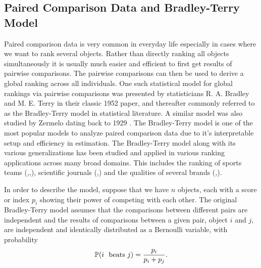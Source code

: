 \documentclass{article}
\begin{document}
\subsection{Paired Comparison Data and Bradley-Terry Model}
Paired comparison data is very common in everyday life especially in cases where we want to rank several objects. Rather than directly ranking all objects simultaneously it is usually much easier and efficient to first get results of pairwise comparisons. The pairwise comparisons can then be used to derive a global ranking across all individuals. 
One such statistical model for global rankings via pairwise comparisons was presented by statisticians R. A. Bradley and M. E. Terry in their classic 1952 \cite{bradley1952rank} paper, and thereafter commonly referred to as the Bradley-Terry model in statistical literature. A similar model was also studied by Zermelo dating back to 1929 \cite{Zermelo1929}. The Bradley-Terry model is one of the most popular models to analyze paired comparison data due to it's interpretable setup and efficiency in estimation. The Bradley-Terry model along with its various generalizations has been studied and applied in various ranking applications across many broad domains. This includes the ranking of sports teams (\cite{MaV2012},\cite{CMV2012},\cite{FaT1994}), scientific journals (\cite{St1994},\cite{Va2016}) and the qualities of several brands (\cite{Ag2002},\cite{RaJ2007}). 
\par
In order to describe the model, suppose that we have $n$ objects, each with a score or index $p_i$ showing their power of competing with each other. The original Bradley-Terry model assumes that the comparisons between different pairs are independent and the results of comparisons between a given pair, object $i$ and $j$, are independent and identically distributed as a Bernoulli variable, with probability
\begin{equation}
    \prob{i\ \text{ beats } j} = \frac{p_i}{p_i + p_j}.
\end{equation}
\end{document}
